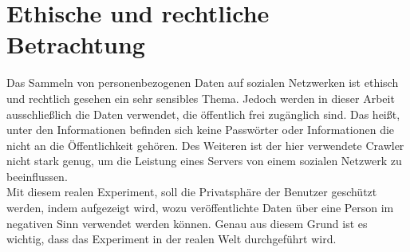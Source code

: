 \chapter{Ethische und rechtliche Betrachtung}  %
\label{cha:EthischeUndRechtlicheBetrachtung} %
Das Sammeln von personenbezogenen Daten auf sozialen Netzwerken ist ethisch und rechtlich gesehen ein sehr sensibles Thema. Jedoch werden in dieser Arbeit ausschließlich die Daten verwendet, die öffentlich frei zugänglich sind. Das heißt, unter den Informationen befinden sich keine Passwörter oder Informationen die nicht an die Öffentlichkeit gehören. Des Weiteren ist der hier verwendete Crawler nicht stark genug, um die Leistung eines Servers von einem sozialen Netzwerk zu beeinflussen.\\
Mit diesem realen Experiment, soll die Privatsphäre der Benutzer geschützt werden, indem aufgezeigt wird, wozu veröffentlichte Daten über eine Person im negativen Sinn verwendet werden können. Genau aus diesem Grund ist es wichtig, dass das Experiment in der realen Welt durchgeführt wird.\\